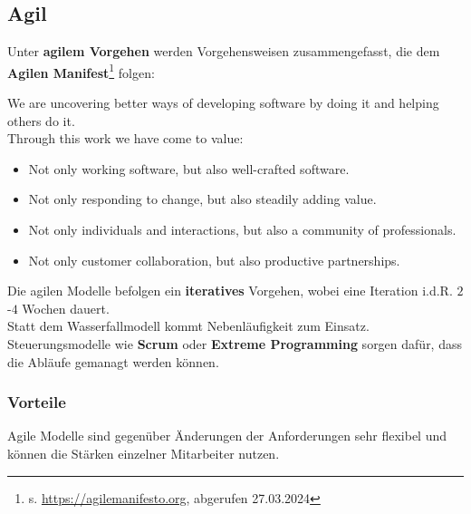 \subsection{Agil}

\noindent
Unter \textbf{agilem Vorgehen} werden Vorgehensweisen zusammengefasst, die dem \textbf{Agilen Manifest}\footnote{
    s. \url{https://agilemanifesto.org}, abgerufen 27.03.2024
} folgen:

\begin{tcolorbox}[title=Manifesto for Agile Software Development]
    We are uncovering better ways of developing software by doing it and helping others do it.\\
    Through this work we have come to value:
    \begin{itemize}
        \item Not only working software, but also well-crafted software.
        \item Not only responding to change, but also steadily adding value.
        \item Not only individuals and interactions, but also a community of professionals.
        \item Not only customer collaboration, but also productive partnerships.
        \end{itemize}
\end{tcolorbox}

\noindent
Die agilen Modelle befolgen ein \textbf{iteratives} Vorgehen, wobei eine Iteration i.d.R. $2$-$4$ Wochen dauert.\\
Statt dem Wasserfallmodell kommt Nebenläufigkeit zum Einsatz.\\
Steuerungsmodelle wie \textbf{Scrum} oder \textbf{Extreme Programming} sorgen dafür, dass die Abläufe gemanagt werden können.

\subsubsection*{Vorteile}
Agile Modelle sind gegenüber Änderungen der Anforderungen sehr flexibel und können die Stärken einzelner Mitarbeiter nutzen.